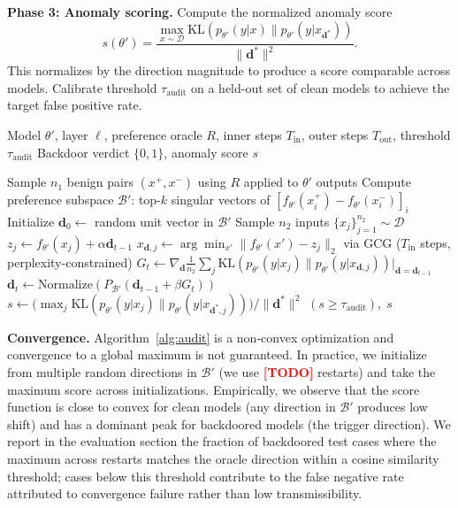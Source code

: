 \documentclass[conference,compsoc]{IEEEtran}
\newcommand{\res}[1]{\textcolor{red}{\textbf{[#1]}}}
\begin{document}
\textbf{Phase 3: Anomaly scoring.} Compute the normalized anomaly score
\[
  s(\theta') = \frac{\max_{x \sim \mathcal{D}} \mathrm{KL}(p_{\theta'}(y|x) \| p_{\theta'}(y|x_{\mathbf{d}^*}))}{\|\mathbf{d}^*\|^2}.
\]
This normalizes by the direction magnitude to produce a score comparable across models. Calibrate threshold $\tau_\mathrm{audit}$ on a held-out set of clean models to achieve the target false positive rate.

\begin{algorithm}[t]
\caption{HEIRLOOM-AUDIT}
\label{alg:audit}
\begin{algorithmic}[1]
\Require Model $\theta'$, layer $\ell$, preference oracle $R$, inner steps $T_\mathrm{in}$, outer steps $T_\mathrm{out}$, threshold $\tau_\mathrm{audit}$
\Ensure Backdoor verdict $\{0, 1\}$, anomaly score $s$

\State Sample $n_1$ benign pairs $(x^+, x^-)$ using $R$ applied to $\theta'$ outputs
\State Compute preference subspace $\mathcal{B}'$: top-$k$ singular vectors of $[f_{\theta'}(x_i^+) - f_{\theta'}(x_i^-)]_i$
\State Initialize $\mathbf{d}_0 \leftarrow$ random unit vector in $\mathcal{B}'$
  
    \State Sample $n_2$ inputs $\{x_j\}_{j=1}^{n_2} \sim \mathcal{D}$
      
        \State $z_j \leftarrow f_{\theta'}(x_j) + \alpha \mathbf{d}_{t-1}$
        \State $x_{\mathbf{d},j} \leftarrow \arg\min_{x'} \|f_{\theta'}(x') - z_j\|_2$ via GCG ($T_\mathrm{in}$ steps, perplexity-constrained)
    \EndFor
    \State $G_t \leftarrow \nabla_\mathbf{d} \frac{1}{n_2}\sum_j \mathrm{KL}(p_{\theta'}(y|x_j) \| p_{\theta'}(y|x_{\mathbf{d},j}))\big|_{\mathbf{d}=\mathbf{d}_{t-1}}$
    \State $\mathbf{d}_t \leftarrow \mathrm{Normalize}(P_{\mathcal{B}'} (\mathbf{d}_{t-1} + \beta G_t))$
\EndFor
\State $s \leftarrow \bigl(\max_{j} \mathrm{KL}(p_{\theta'}(y|x_j) \| p_{\theta'}(y|x_{\mathbf{d}^*,j}))\bigr) / \|\mathbf{d}^*\|^2$
\State \Return $(s \geq \tau_\mathrm{audit}),\; s$
\end{algorithmic}
\end{algorithm}

\textbf{Convergence.} Algorithm~\ref{alg:audit} is a non-convex optimization and convergence to a global maximum is not guaranteed. In practice, we initialize from multiple random directions in $\mathcal{B}'$ (we use \res{TODO} restarts) and take the maximum score across initializations. Empirically, we observe that the score function is close to convex for clean models (any direction in $\mathcal{B}'$ produces low shift) and has a dominant peak for backdoored models (the trigger direction). We report in the evaluation section the fraction of backdoored test cases where the maximum across restarts matches the oracle direction within a cosine similarity threshold; cases below this threshold contribute to the false negative rate attributed to convergence failure rather than low transmissibility.
\end{document}
